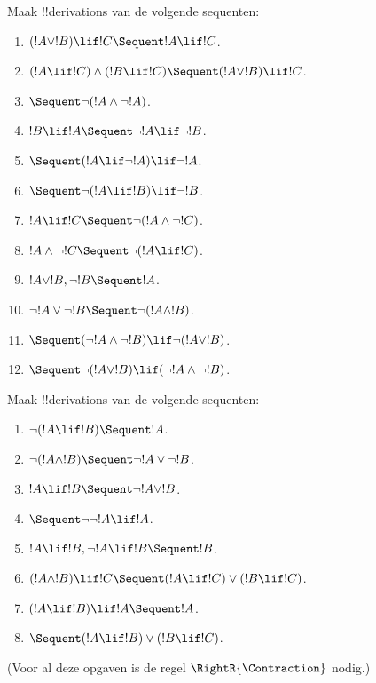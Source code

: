 \documentclass[../../../include/open-logic-section]{subfiles}
\begin{document}
\begin{prob}
Maak !!{derivation}s van de volgende sequenten:
\begin{enumerate}
\item $(!A \lor !B) \lif !C \Sequent !A \lif !C$.
\item $(!A \lif !C) \land (!B \lif !C) \Sequent (!A \lor !B) \lif !C$.
\item $\Sequent \lnot(!A \land \lnot !A)$.
\item $!B \lif !A \Sequent \lnot !A \lif \lnot !B$.
\item $\Sequent (!A \lif \lnot !A) \lif \lnot !A$.
\item $\Sequent \lnot(!A \lif !B) \lif \lnot !B$.
\item $!A \lif !C \Sequent \lnot (!A \land \lnot !C)$.
\item $!A \land \lnot !C \Sequent \lnot (!A \lif !C)$.
\item $!A \lor !B, \lnot !B \Sequent !A$.
\item $\lnot !A \lor \lnot !B \Sequent \lnot(!A \land !B)$.
\item $\Sequent (\lnot !A \land \lnot !B) \lif\lnot(!A \lor !B)$.
\item $\Sequent \lnot(!A \lor !B) \lif (\lnot !A \land \lnot !B)$.
\end{enumerate}
\end{prob}

\begin{prob}
Maak !!{derivation}s van de volgende sequenten:
\begin{enumerate}
\item $\lnot(!A \lif !B) \Sequent !A$.
\item $\lnot(!A \land !B) \Sequent \lnot !A \lor \lnot !B$.
\item $!A \lif !B \Sequent \lnot !A \lor !B$.
\item $\Sequent \lnot \lnot !A \lif !A$.
\item $!A \lif !B, \lnot !A \lif !B \Sequent !B$.
\item $(!A \land !B) \lif !C \Sequent (!A \lif !C) \lor (!B \lif !C)$.
\item $(!A \lif !B) \lif !A \Sequent !A$.
\item $\Sequent (!A \lif !B) \lor (!B \lif !C)$.
\end{enumerate}
(Voor al deze opgaven is de regel $\RightR{\Contraction}$ nodig.)
\end{prob}
\end{document}
